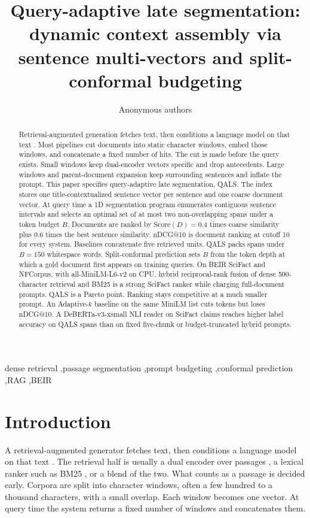 \documentclass[preprint,12pt,authoryear]{elsarticle}
\begin{document}
\begin{frontmatter}
\title{Query-adaptive late segmentation: dynamic context assembly via sentence multi-vectors and split-conformal budgeting}
\author{Anonymous authors}
\address{Details omitted for double-anonymized review}
\begin{abstract}
Retrieval-augmented generation fetches text, then conditions a language model on that text \citep{lewis2020retrieval,karpukhin2020dense}. Most pipelines cut documents into static character windows, embed those windows, and concatenate a fixed number of hits. The cut is made before the query exists. Small windows keep dual-encoder vectors specific and drop antecedents. Large windows and parent-document expansion keep surrounding sentences and inflate the prompt. This paper specifies query-adaptive late segmentation, QALS. The index stores one title-contextualized sentence vector per sentence and one coarse document vector. At query time a 1D segmentation program enumerates contiguous sentence intervals and selects an optimal set of at most two non-overlapping spans under a token budget \(B\). Documents are ranked by \(\mathrm{Score}(D)=0.4\) times coarse similarity plus \(0.6\) times the best sentence similarity. nDCG@10 is document ranking at cutoff 10 for every system. Baselines concatenate five retrieved units. QALS packs spans under \(B=150\) whitespace words. Split-conformal prediction sets \(B\) from the token depth at which a gold document first appears on training queries. On BEIR SciFact and NFCorpus, with all-MiniLM-L6-v2 on CPU, hybrid reciprocal-rank fusion of dense 500-character retrieval and BM25 is a strong SciFact ranker while charging full-document prompts. QALS is a Pareto point. Ranking stays competitive at a much smaller prompt. An Adaptive-\(k\) baseline on the same MiniLM list cuts tokens but loses nDCG@10. A DeBERTa-v3-xsmall NLI reader on SciFact claims reaches higher label accuracy on QALS spans than on fixed five-chunk or budget-truncated hybrid prompts.
\end{abstract}
\begin{keyword}
dense retrieval \sep passage segmentation \sep prompt budgeting \sep conformal prediction \sep RAG \sep BEIR
\end{keyword}
\end{frontmatter}

\section{Introduction}
A retrieval-augmented generator fetches text, then conditions a language model on that text \citep{lewis2020retrieval}. The retrieval half is usually a dual encoder over passages \citep{karpukhin2020dense}, a lexical ranker such as BM25 \citep{robertson2009probabilistic}, or a blend of the two. What counts as a passage is decided early. Corpora are split into character windows, often a few hundred to a thousand characters, with a small overlap. Each window becomes one vector. At query time the system returns a fixed number of windows and concatenates them.
\end{document}
